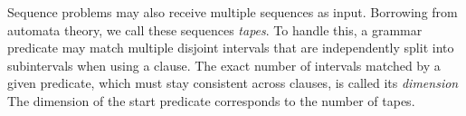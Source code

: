 Sequence problems may also receive multiple sequences as input.
Borrowing from automata theory, we call these sequences \emph{tapes}.
To handle this, a grammar predicate may match multiple disjoint intervals that are independently split into subintervals when using a clause.
The exact number of intervals matched by a given predicate, which must stay consistent across clauses, is called its \emph{dimension}
The dimension of the start predicate corresponds to the number of tapes.

